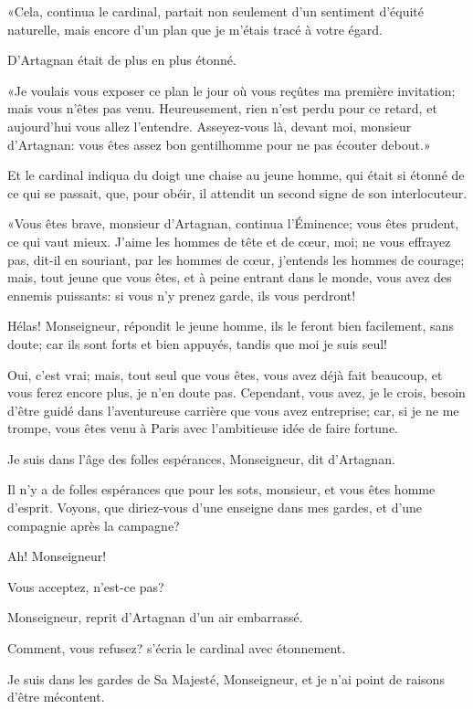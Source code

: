 «Cela, continua le cardinal, partait non seulement d'un sentiment d'équité naturelle, mais encore d'un plan que je m'étais tracé à votre égard. 

D'Artagnan était de plus en plus étonné. 

«Je voulais vous exposer ce plan le jour où vous reçûtes ma première invitation; mais vous n'êtes pas venu. Heureusement, rien n'est perdu pour ce retard, et aujourd'hui vous allez l'entendre. Asseyez-vous là, devant moi, monsieur d'Artagnan: vous êtes assez bon gentilhomme pour ne pas écouter debout.» 

Et le cardinal indiqua du doigt une chaise au jeune homme, qui était si étonné de ce qui se passait, que, pour obéir, il attendit un second signe de son interlocuteur. 

«Vous êtes brave, monsieur d'Artagnan, continua l'Éminence; vous êtes prudent, ce qui vaut mieux. J'aime les hommes de tête et de cœur, moi; ne vous effrayez pas, dit-il en souriant, par les hommes de cœur, j'entends les hommes de courage; mais, tout jeune que vous êtes, et à peine entrant dans le monde, vous avez des ennemis puissants: si vous n'y prenez garde, ils vous perdront! 

\speak  Hélas! Monseigneur, répondit le jeune homme, ils le feront bien facilement, sans doute; car ils sont forts et bien appuyés, tandis que moi je suis seul! 

\speak  Oui, c'est vrai; mais, tout seul que vous êtes, vous avez déjà fait beaucoup, et vous ferez encore plus, je n'en doute pas. Cependant, vous avez, je le crois, besoin d'être guidé dans l'aventureuse carrière que vous avez entreprise; car, si je ne me trompe, vous êtes venu à Paris avec l'ambitieuse idée de faire fortune. 

\speak  Je suis dans l'âge des folles espérances, Monseigneur, dit d'Artagnan. 

\speak  Il n'y a de folles espérances que pour les sots, monsieur, et vous êtes homme d'esprit. Voyons, que diriez-vous d'une enseigne dans mes gardes, et d'une compagnie après la campagne? 

\speak  Ah! Monseigneur! 

\speak  Vous acceptez, n'est-ce pas? 

\speak  Monseigneur, reprit d'Artagnan d'un air embarrassé. 

\speak  Comment, vous refusez? s'écria le cardinal avec étonnement. 

\speak  Je suis dans les gardes de Sa Majesté, Monseigneur, et je n'ai point de raisons d'être mécontent. 

